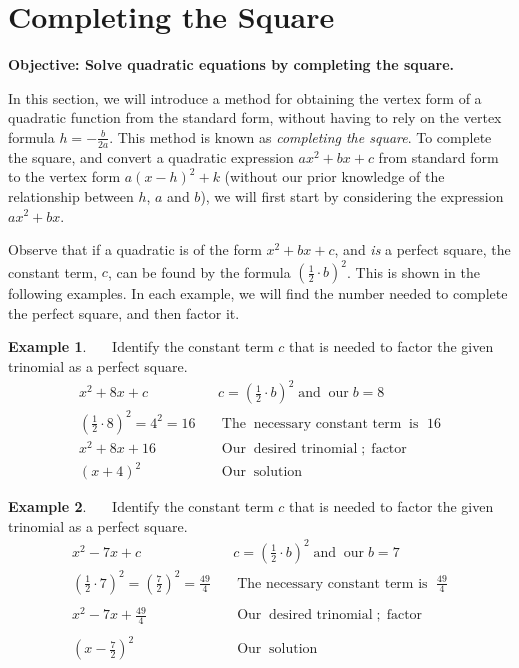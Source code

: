 \documentclass[12pt]{book}
\theoremstyle{definition}
\newtheorem{example}{Example}
\newcommand{\tmop}[1]{\ensuremath{\operatorname{#1}}}
\begin{document}
\section{Completing the Square}
{\bf Objective: Solve quadratic equations by completing the square.}\par

In this section, we will introduce a method for obtaining the vertex form of a quadratic function from the standard form, without having to rely on the vertex formula $h=-\displaystyle\frac{b}{2a}$.  This method is known as {\it completing the square}.  To complete the square, and convert a quadratic expression $ax^2+bx+c$ from standard form to the vertex form $a(x-h)^2+k$ (without our prior knowledge of the relationship between $h$, $a$ and $b$), we will first start by considering the expression $ax^2+bx$.\par
Observe that if a quadratic is of the form $x^2 + b x + c$, and \textit{is} a perfect square, the constant
term, $c$, can be found by the formula $\left( \frac{1}{2} \cdot b\right)^2$. This is shown in the following examples.  In each example, we will find the number needed to complete the perfect square, and then factor it.
\newpage
\begin{example}~~~Identify the constant term $c$ that is needed to factor the given trinomial as a perfect square.
  \begin{eqnarray*}
    x^2 + 8 x + c &  & c = \left( \frac{1}{2} \cdot b \right)^2 \tmop{and}
    \tmop{our} b = 8\\
    \left( \frac{1}{2} \cdot 8 \right)^2 = 4^2 = 16 &  & \tmop{The}
    \tmop{necessary~constant~term} \tmop{is~} 16\\
    x^2 + 8 x + 16 &  & \tmop{Our} \tmop{desired~trinomial}; \tmop{factor}\\
    (x + 4)^2 &  & \tmop{Our} \tmop{solution}
  \end{eqnarray*}
\end{example}
\begin{example}~~~Identify the constant term $c$ that is needed to factor the given trinomial as a perfect square.
  \begin{eqnarray*}
    x^2 - 7 x + c &  & c = \left( \frac{1}{2} \cdot b \right)^2 \tmop{and}
    \tmop{our} b = 7\\
    \left( \frac{1}{2} \cdot 7 \right)^2 = \left( \frac{7}{2} \right)^2 =
    \frac{49}{4} &  & \tmop{The~necessary~constant~term~is~} \frac{49}{4}\\
    &  & \\
    x^2 - 7 x + \frac{49}{4} &  & \tmop{Our} \tmop{desired~trinomial}; \tmop{factor}\\
    &  & \\
    \left( x - \frac{7}{2} \right)^2 &  & \tmop{Our} \tmop{solution}
  \end{eqnarray*}
\end{example}
\end{document}
